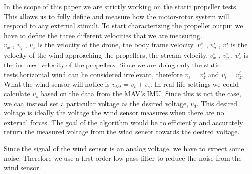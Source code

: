 \documentclass[twocolumn]{article}
\begin{document}
	In the scope of this paper we are strictly working on the static propeller tests. This allows us to fully define and measure how the motor-rotor system will respond to any external stimuli. To start characterizing the propeller output we have to define the three different velocities that we are measuring.\\
	
	\noindent $v_{x}$ , $ v_{y}$ , $ v_{z}$  Is the velocity of the drone, the body frame velocity. 
	$v^s_{x}$ , $v^s_{y}$ , $v^s_{z}$  is the velocity of the wind approaching the propellers, the stream velocity. 
	$v^i_{x}$ , $v^i_{y}$ , $v^i_{z}$ is the induced velocity of the propellers. Since we are doing only the static tests,horizontal wind can be considered irrelevant, therefore $v_s = v^s_{z}$ and $v_i = v^i_{z}$. What the wind sensor will notice is $v_{tot} = v_{i} + v_{s}$. In real life settings we could calculate $v_s$ based on the data from the MAV's IMU. Since this is not the case, we can instead set a particular voltage as the desired voltage, $v_d$. This desired voltage is ideally the voltage the wind sensor measures when there are no external forces. The goal of the algorithm would be to efficiently and accurately return the measured voltage from the wind sensor towards the desired voltage. 
	
	Since the signal of the wind sensor is an analog voltage, we have to expect some noise. Therefore we use a first order low-pass filter to reduce the noise from the wind sensor.
\end{document}
